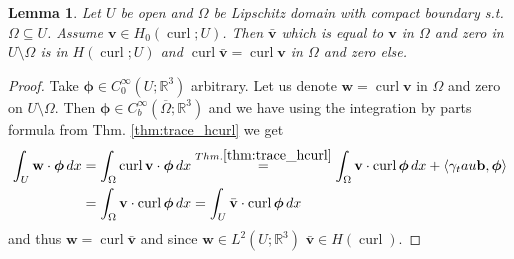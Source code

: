 \documentclass[12pt,a4paper]{article}
\numberwithin{equation}{subsection}
\newtheorem{lemma}{Lemma}[section]
\numberwithin{lemma}{subsection}
\theoremstyle{definition}
\DeclareMathOperator{\curl}{curl}
\newcommand{\real}{\mathbb{R}}
\begin{document}
\begin{lemma}\label{lem:extension_hcurl}
    Let $U$ be open and $\Omega$ be Lipschitz domain with compact boundary s.t.
    $\Omega \subseteq U$. Assume $\mathbf{v} \in H_0(\curl;U)$. Then 
    $\bar{\mathbf{v}}$ which is equal to $\mathbf{v}$ in $\Omega$ and zero 
    in $U \setminus \Omega$ is in $H(\curl;U)$ and $\curl \bar{\mathbf{v}} = \curl \mathbf{v}$ 
    in $\Omega$ and zero else.
\end{lemma}
\begin{proof}
    Take $\boldsymbol{\phi} \in C_0^\infty(U;\real^3)$ arbitrary. Let us denote 
    $\mathbf{w} = \curl \mathbf{v}$ in $\Omega$ and zero on $U\setminus \Omega$.
    Then $\boldsymbol{\phi} \in C_b^\infty(\overline{\Omega};\real^3)$ and we have 
    using the integration by parts formula from Thm. \ref{thm:trace_hcurl}
    we get 
    \begin{align*}
        \int_U\mathbf{w} \cdot \boldsymbol{\phi} \, dx 
        &= \int_\Omega \curl \mathbf{v} \cdot \boldsymbol{\phi} \, dx
        \stackrel{Thm. \ref{thm:trace_hcurl}}{=} \int_\Omega \mathbf{v} \cdot \curl \boldsymbol{\phi} \, dx
            + \langle \gamma_tau \mathbf{b}, \boldsymbol{\phi}\rangle
        \\ &= \int_\Omega \mathbf{v} \cdot \curl \boldsymbol{\phi} \, dx
        = \int_U \bar{\mathbf{v}} \cdot \curl \boldsymbol{\phi} \, dx
    \end{align*}
    and thus $\mathbf{w} = \curl \bar{\mathbf{v}}$ and since $\mathbf{w} \in L^2(U;\real^3)$
    $\bar{\mathbf{v}} \in H(\curl)$.
\end{proof}
\end{document}
